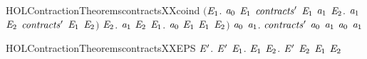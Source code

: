 \begin{SaveVerbatim}{HOLContractionTheoremscontractsXXcoind}
            \ensuremath{(}\HOLSymConst{\HOLTokenForall{}}\ensuremath{\HOLBoundVar{E}\sb{\mathrm{1}}}.
                 \ensuremath{\HOLBoundVar{a}\sb{\mathrm{0}}} \HOLTokenTransBegin\HOLConst{\ensuremath{\tau}}\HOLTokenTransEnd \ensuremath{\HOLBoundVar{E}\sb{\mathrm{1}}} \HOLSymConst{\HOLTokenImp{}}
                 \ensuremath{\HOLBoundVar{contracts}\sp{\prime}} \ensuremath{\HOLBoundVar{E}\sb{\mathrm{1}}} \ensuremath{\HOLBoundVar{a}\sb{\mathrm{1}}} \HOLSymConst{\HOLTokenDisj{}}
                 \HOLSymConst{\HOLTokenExists{}}\ensuremath{\HOLBoundVar{E}\sb{\mathrm{2}}}. \ensuremath{\HOLBoundVar{a}\sb{\mathrm{1}}} \HOLTokenTransBegin\HOLConst{\ensuremath{\tau}}\HOLTokenTransEnd \ensuremath{\HOLBoundVar{E}\sb{\mathrm{2}}} \HOLSymConst{\HOLTokenConj{}} \ensuremath{\HOLBoundVar{contracts}\sp{\prime}} \ensuremath{\HOLBoundVar{E}\sb{\mathrm{1}}} \ensuremath{\HOLBoundVar{E}\sb{\mathrm{2}}}\ensuremath{)} \HOLSymConst{\HOLTokenConj{}}
            \HOLSymConst{\HOLTokenForall{}}\ensuremath{\HOLBoundVar{E}\sb{\mathrm{2}}}. \ensuremath{\HOLBoundVar{a}\sb{\mathrm{1}}} \HOLTokenTransBegin\HOLConst{\ensuremath{\tau}}\HOLTokenTransEnd \ensuremath{\HOLBoundVar{E}\sb{\mathrm{2}}} \HOLSymConst{\HOLTokenImp{}} \HOLSymConst{\HOLTokenExists{}}\ensuremath{\HOLBoundVar{E}\sb{\mathrm{1}}}.  \ensuremath{\HOLBoundVar{a}\sb{\mathrm{0}}} \ensuremath{\HOLBoundVar{E}\sb{\mathrm{1}}} \HOLSymConst{\HOLTokenConj{}}  \ensuremath{\HOLBoundVar{E}\sb{\mathrm{1}}} \ensuremath{\HOLBoundVar{E}\sb{\mathrm{2}}}\ensuremath{)} \HOLSymConst{\HOLTokenImp{}}
       \HOLSymConst{\HOLTokenForall{}}\ensuremath{\HOLBoundVar{a}\sb{\mathrm{0}}} \ensuremath{\HOLBoundVar{a}\sb{\mathrm{1}}}. \ensuremath{\HOLBoundVar{contracts}\sp{\prime}} \ensuremath{\HOLBoundVar{a}\sb{\mathrm{0}}} \ensuremath{\HOLBoundVar{a}\sb{\mathrm{1}}} \HOLSymConst{\HOLTokenImp{}} \ensuremath{\HOLBoundVar{a}\sb{\mathrm{0}}}  \ensuremath{\HOLBoundVar{a}\sb{\mathrm{1}}}
\end{SaveVerbatim}
\newcommand{\HOLContractionTheoremscontractsXXcoind}{\UseVerbatim{HOLContractionTheoremscontractsXXcoind}}
\begin{SaveVerbatim}{HOLContractionTheoremscontractsXXEPS}
\HOLTokenTurnstile{} \HOLSymConst{\HOLTokenForall{}} \ensuremath{\HOLBoundVar{E}\sp{\prime}}.
         \ensuremath{\HOLBoundVar{E}\sp{\prime}} \HOLSymConst{\HOLTokenImp{}}
       \HOLSymConst{\HOLTokenForall{}}\ensuremath{\HOLBoundVar{E}\sb{\mathrm{1}}}.   \ensuremath{\HOLBoundVar{E}\sb{\mathrm{1}}} \HOLSymConst{\HOLTokenImp{}} \HOLSymConst{\HOLTokenExists{}}\ensuremath{\HOLBoundVar{E}\sb{\mathrm{2}}}.  \ensuremath{\HOLBoundVar{E}\sp{\prime}} \ensuremath{\HOLBoundVar{E}\sb{\mathrm{2}}} \HOLSymConst{\HOLTokenConj{}} \ensuremath{\HOLBoundVar{E}\sb{\mathrm{1}}}  \ensuremath{\HOLBoundVar{E}\sb{\mathrm{2}}}
\end{SaveVerbatim}
